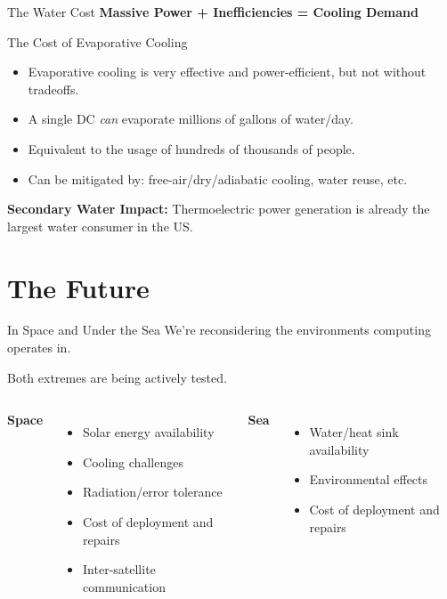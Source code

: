 \documentclass[aspectratio=169]{beamer}
\begin{document}
\begin{frame}{The Water Cost}
    \textbf{Massive Power + Inefficiencies = Cooling Demand}

    \begin{block}{The Cost of Evaporative Cooling}
        \begin{itemize}
            \item Evaporative cooling is very effective and power-efficient, but not without tradeoffs.
            \item A single DC \textit{can} evaporate millions of gallons of water/day.
            \item Equivalent to the usage of hundreds of thousands of people.
            \item Can be mitigated by: free-air/dry/adiabatic cooling, water reuse, etc.
        \end{itemize}
    \end{block}

    \vspace{1em}
    \textbf{Secondary Water Impact:} Thermoelectric power generation is already the largest water consumer in the US.
\end{frame}


\section{The Future}

\begin{frame}{In Space and Under the Sea}
    We're reconsidering the environments computing operates in.

    Both extremes are being actively tested.

    \vspace{1em}
    \begin{columns}[c, onlytextwidth]
            \textbf{Space}
            \begin{itemize}
                \item Solar energy availability
                \item Cooling challenges
                \item Radiation/error tolerance
                \item Cost of deployment and repairs
                \item Inter-satellite communication
            \end{itemize}
            \textbf{Sea}
            \begin{itemize}
                \item Water/heat sink availability
                \item Environmental effects
                \item Cost of deployment and repairs
            \end{itemize}
    \end{columns}

\end{frame}
\end{document}
